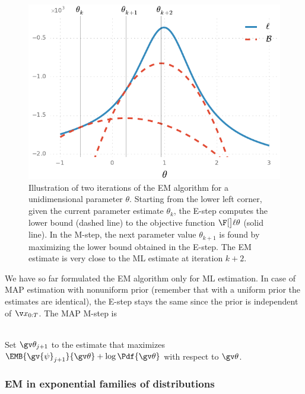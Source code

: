 \begin{figure}[htb]%
    \centering%
  	\includegraphics{img/ar1_ex_em}%
	\caption{%
Illustration of two iterations of the EM algorithm for a unidimensional parameter 
$\theta$. Starting from the lower left corner, given the current parameter estimate
$\theta_k$, the E-step computes the lower bound (dashed line) 
to the objective function $\lLH[\theta]$ (solid line). In the M-step, the next parameter 
value $\theta_{k+1}$ is found by maximizing the lower bound obtained in the E-step. The 
EM estimate is very close to the ML estimate at iteration $k+2$.
   	}
	\label{fig:ar1_em}
 \end{figure}

We have so far formulated the EM algorithm only for ML estimation. In case
of MAP estimation with nonuniform prior (remember that with a uniform prior the estimates are identical), 
the E-step stays the same since the prior is independent of $\X$.
The MAP M-step is
\begin{description}
\addtolength{\leftskip}{1cm}
  \item[M-step (MAP)]\hfill\\ 
  Set $\Th_{j+1}$ to the estimate that maximizes $\EMB{\gv{\psi}_{j+1}}{\Th}+\log\Pdf{\Th}$ with respect to $\Th$.
\end{description}%


 

\subsubsection*{EM in exponential families of distributions}\label{sec:EM_exp}%

